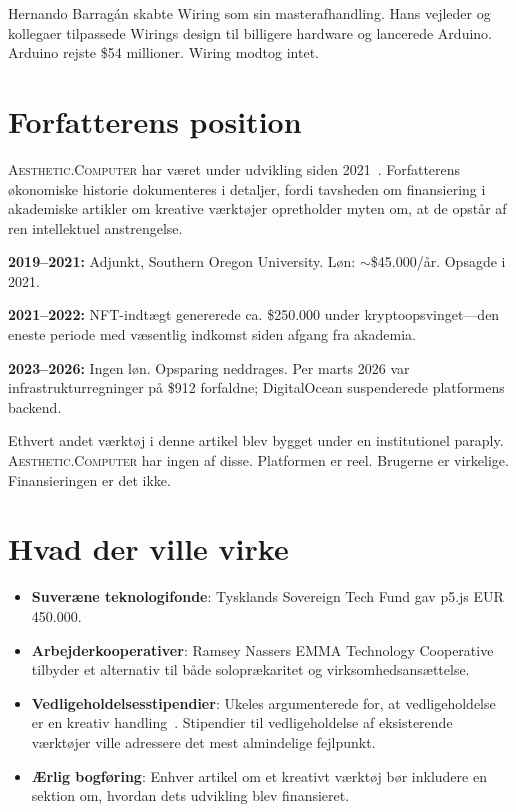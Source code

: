 \documentclass[10pt,letterpaper,twocolumn]{article}
\newcommand{\ac}{\textsc{Aesthetic.Computer}}
\begin{document}
Hernando Barrag\'an skabte Wiring som sin masterafhandling. Hans vejleder og kollegaer tilpassede Wirings design til billigere hardware og lancerede Arduino. Arduino rejste \$54 millioner. Wiring modtog intet.

\section{Forfatterens position}

\ac{} har været under udvikling siden 2021~\citep{scudder2026ac}. Forfatterens økonomiske historie dokumenteres i detaljer, fordi tavsheden om finansiering i akademiske artikler om kreative værktøjer opretholder myten om, at de opstår af ren intellektuel anstrengelse.

\textbf{2019--2021:} Adjunkt, Southern Oregon University. Løn: $\sim$\$45.000/år. Opsagde i 2021.

\textbf{2021--2022:} NFT-indtægt genererede ca. \$250.000 under kryptoopsvinget---den eneste periode med væsentlig indkomst siden afgang fra akademia.

\textbf{2023--2026:} Ingen løn. Opsparing neddrages. Per marts 2026 var infrastrukturregninger på \$912 forfaldne; DigitalOcean suspenderede platformens backend.

Ethvert andet værktøj i denne artikel blev bygget under en institutionel paraply. \ac{} har ingen af disse. Platformen er reel. Brugerne er virkelige. Finansieringen er det ikke.

\section{Hvad der ville virke}

\begin{itemize}
  \item \textbf{Suveræne teknologifonde}: Tysklands Sovereign Tech Fund gav p5.js EUR 450.000.
  \item \textbf{Arbejderkooperativer}: Ramsey Nassers EMMA Technology Cooperative tilbyder et alternativ til både soloprækaritet og virksomhedsansættelse.
  \item \textbf{Vedligeholdelsesstipendier}: Ukeles argumenterede for, at vedligeholdelse er en kreativ handling~\citep{ukeles1969manifesto}. Stipendier til vedligeholdelse af eksisterende værktøjer ville adressere det mest almindelige fejlpunkt.
  \item \textbf{Ærlig bogføring}: Enhver artikel om et kreativt værktøj bør inkludere en sektion om, hvordan dets udvikling blev finansieret.
\end{itemize}
\end{document}
